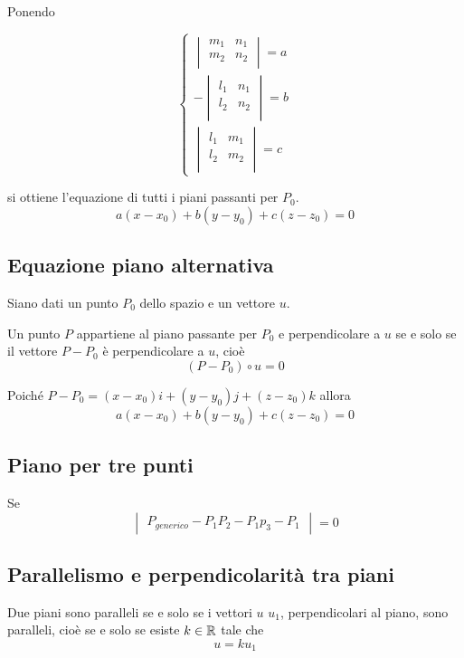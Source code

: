 Ponendo

$$
\begin{cases}
\begin{vmatrix}
m_1 & n_1 \\
m_2 & n_2 \\
\end{vmatrix} = a \\
- \begin{vmatrix}
l_1 & n_1 \\
l_2 & n_2 \\
\end{vmatrix} = b \\
\begin{vmatrix}
l_1 & m_1 \\
l_2 & m_2 \\
\end{vmatrix} = c
\end{cases}
$$

si ottiene l'equazione di tutti i piani passanti per $P_0$.
$$
a(x-x_0) + b(y-y_0) + c(z-z_0) = 0
$$

\subsection{Equazione piano alternativa}

Siano dati un punto $P_0$ dello spazio e un vettore $u$.

Un punto $P$ appartiene al piano passante per $P_0$ e perpendicolare a $u$ se e solo se il vettore $P-P_0$ è perpendicolare a $u$, cioè $$(P-P_0) \circ u =0$$

Poiché $P-P_0 = (x-x_0)i + (y-y_0)j +(z-z_0)k$ allora $$ a(x-x_0) + b(y-y_0) +c(z-z_0) = 0$$

\subsection{Piano per tre punti}

Se
$$
\begin{vmatrix}
P_{generico} - P_1
P_2 - P_1
p_3 - P_1
\end{vmatrix} = 0
$$

\subsection{Parallelismo e perpendicolarità tra piani}

Due piani sono paralleli se e solo se i vettori $u$ $u_1$, perpendicolari al piano, sono paralleli, cioè se e solo se esiste $k \in \mathbb{R}$ tale che $$u = k u_1$$

